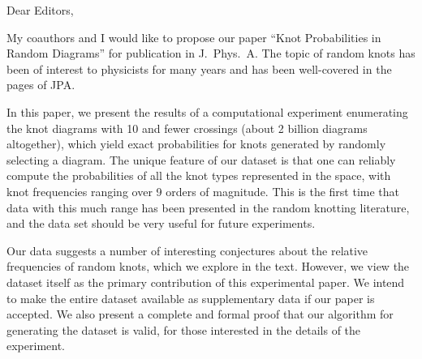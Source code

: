 \documentclass[12pt]{article}
\begin{document}
\pagestyle{empty}

\noindent 
Dear Editors,

My coauthors and I would like to propose our paper ``Knot Probabilities in Random Diagrams'' for publication in J.\ Phys.\ A. 
The topic of random knots has been of interest to physicists for many years and has been well-covered in the pages of JPA.

In this paper, we present the results of a computational experiment enumerating the knot diagrams with 10 and fewer crossings (about 2 billion diagrams altogether), which yield exact probabilities for knots generated by randomly selecting a diagram. 
The unique feature of our dataset is that one can reliably compute the probabilities of all the knot types represented in the space, with knot frequencies ranging over 9 orders of magnitude. This is the first time that data with this much range has been presented in the random knotting literature, and the data set should be very useful for future experiments. 

Our data suggests a number of interesting conjectures about the relative frequencies of random knots, which we explore in the text. However, we view the dataset itself as the primary contribution of this experimental paper. We intend to make the entire dataset available as supplementary data if our paper is accepted. We also present a complete and formal proof that our algorithm for generating the dataset is valid, for those interested in the details of the experiment. 
\end{document}
